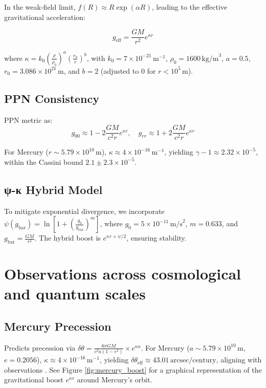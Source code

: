 \documentclass[a4paper,12pt]{article}
\begin{document}
In the weak-field limit, \( f(R) \approx R \exp(\alpha R) \), leading to the effective gravitational acceleration:

\[ g_{\mathrm{eff}} = \frac{G M}{r^2} e^{\kappa r} \]

where \( \kappa = k_0 \left( \frac{\rho}{\rho_0} \right)^a \left( \frac{r_0}{r} \right)^b \), with \( k_0 = 7 \times 10^{-21} \, \text{m}^{-1} \), \( \rho_0 = 1600 \, \text{kg/m}^3 \), \( a = 0.5 \), \( r_0 = 3.086 \times 10^{21} \, \text{m} \), and \( b = 2 \) (adjusted to 0 for \( r < 10^5 \, \text{m} \)).

\subsection{PPN Consistency}
PPN metric as:
\[ g_{00} \approx 1 - 2 \frac{G M}{c^2 r} e^{\kappa r}, \quad g_{rr} \approx 1 + 2 \frac{G M}{c^2 r} e^{\kappa r} \]

For Mercury (\( r \sim 5.79 \times 10^{10} \, \text{m} \)), \( \kappa \approx 4 \times 10^{-16} \, \text{m}^{-1} \), yielding \( \gamma - 1 \approx 2.32 \times 10^{-5} \), within the Cassini bound \( 2.1 \pm 2.3 \times 10^{-5} \).

\subsection{ψ-κ Hybrid Model}
To mitigate exponential divergence, we incorporate \( \psi(g_{\mathrm{bar}}) = \ln \left[ 1 + \left( \frac{g_0}{g_{\mathrm{bar}}} \right)^m \right] \), where \( g_0 = 5 \times 10^{-11} \, \text{m/s}^2 \), \( m = 0.633 \), and \( g_{\mathrm{bar}} = \frac{G M}{r^2} \). The hybrid boost is \( e^{\kappa r + \psi / 2} \), ensuring stability.

\section{Observations across cosmological and quantum scales}
\subsection{Mercury Precession}
Predicts precession via \( \delta\theta = \frac{6\pi G M}{c^2 a (1 - e^2)} \times e^{\kappa a} \). For Mercury (\( a \sim 5.79 \times 10^{10} \, \text{m} \), \( e = 0.2056 \)), \( \kappa \approx 4 \times 10^{-16} \, \text{m}^{-1} \), yielding \( \delta\theta_{\mathrm{eff}} \approx 43.01 \, \text{arcsec/century} \), aligning with observations \citep{Clemence1947}. See Figure \ref{fig:mercury_boost} for a graphical representation of the gravitational boost \( e^{\kappa r} \) around Mercury’s orbit.
\end{document}
